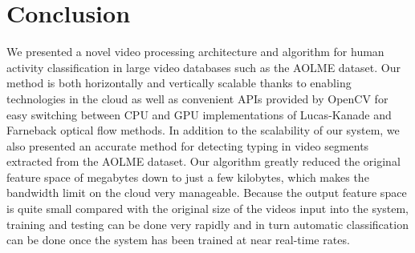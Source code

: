 \chapter{Conclusion}
We presented a novel video processing architecture and algorithm for human
activity classification in large video databases such as the AOLME dataset. Our
method is both horizontally and vertically scalable thanks to enabling
technologies in the cloud as well as convenient APIs provided by OpenCV for easy
switching between CPU and GPU implementations of Lucas-Kanade and Farneback
optical flow methods. In addition to the scalability of our system, we also
presented an accurate method for detecting typing in video segments extracted
from the AOLME dataset. Our algorithm greatly reduced the original feature space
of megabytes down to just a few kilobytes, which makes the bandwidth limit on
the cloud very manageable. Because the output feature space is quite small
compared with the original size of the videos input into the system, training
and testing can be done very rapidly and in turn automatic classification can be
done once the system has been trained at near real-time rates.
